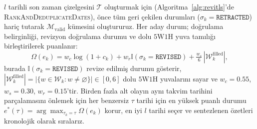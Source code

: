 ﻿\documentclass[journal]{IEEEtran}
\begin{document}
$l$ tarihli son zaman \c{c}izelgesini $\mathcal{T}$ olu\c{s}turmak i\c{c}in (Algoritma~\ref{alg:revitls}'de \textsc{RankAndDeduplicateDates}), \"{o}nce t\"{u}m geri \c{c}ekilen durumlar{\i} ($\sigma_k = \texttt{RETRACTED}$) hari\c{c} tutarak $\mathcal{M}_{\text{valid}}$ k\"{u}mesini olu\c{s}tururuz. Her aday durum; do\u{g}rulama belirginli\u{g}i, revizyon do\u{g}rulama durumu ve dolu $5\text{W}1\text{H}$ yuva tam{\i}l{\i}\u{g}{\i} birle\c{s}tirilerek puanlan{\i}r:
\begin{equation}
\Omega(e_k) = w_c \log(1 + c_k) + w_r \mathbb{I}(\sigma_k\!=\!\texttt{REVISED}) + \tfrac{w_s}{6}\,|\mathcal{W}_k^{\text{filled}}|,
\label{eq:salience_score}
\end{equation}
burada $\mathbb{I}(\sigma_k\!=\!\texttt{REVISED})$ revize edilmi\c{s} durumu g\"{o}sterir, $|\mathcal{W}_k^{\text{filled}}| = |\{w \in \mathcal{W}_k : w \neq \varnothing\}| \in [0, 6]$ dolu $5\text{W}1\text{H}$ yuvalar{\i}n{\i} sayar ve $w_c = 0.55$, $w_s = 0.30$, $w_r = 0.15$'tir. Birden fazla alt olay{\i}n ayn{\i} takvim tarihini par\c{c}alamas{\i}n{\i} \"{o}nlemek i\c{c}in her benzersiz $\tau$ tarihi i\c{c}in en y\"{u}ksek puanl{\i} durumu $e^*(\tau) = \arg\max_{\tau_k = \tau} \Omega(e_k)$ korur, en iyi $l$ tarihi se\c{c}er ve sentezlenen \"{o}zetleri kronolojik olarak s{\i}ralar{\i}z.

\begin{table}[t]
\centering
\caption{Tam-Derlem De\u{g}erlendirme Ak{\i}\c{s}lar{\i} ($17{,}679$ Aral{\i}k-Filtreli Makale, \"{O}rneklemesiz), Kontroll\"{u} Setler ve Eski \c{C}al{\i}\c{s}ma \"{O}zeti}
\label{tab:datasets}
\renewcommand{\arraystretch}{1.12}
\end{table}
\end{document}
